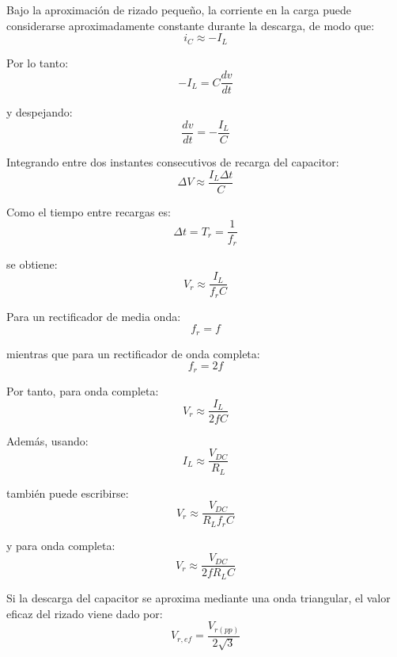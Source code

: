 \documentclass[12pt,a4paper]{article}
\begin{document}
Bajo la aproximación de rizado pequeño, la corriente en la carga puede considerarse aproximadamente constante durante la descarga, de modo que:
\begin{equation}
i_C\approx -I_L
\end{equation}

Por lo tanto:
\begin{equation}
-I_L=C\frac{dv}{dt}
\end{equation}

y despejando:
\begin{equation}
\frac{dv}{dt}=-\frac{I_L}{C}
\end{equation}

Integrando entre dos instantes consecutivos de recarga del capacitor:
\begin{equation}
\Delta V\approx\frac{I_L\Delta t}{C}
\end{equation}

Como el tiempo entre recargas es:
\begin{equation}
\Delta t=T_r=\frac{1}{f_r}
\end{equation}

se obtiene:
\begin{equation}
V_r\approx\frac{I_L}{f_rC}
\end{equation}

Para un rectificador de media onda:
\begin{equation}
f_r=f
\end{equation}

mientras que para un rectificador de onda completa:
\begin{equation}
f_r=2f
\end{equation}

Por tanto, para onda completa:
\begin{equation}
V_r\approx\frac{I_L}{2fC}
\end{equation}

Además, usando:
\begin{equation}
I_L\approx\frac{V_{DC}}{R_L}
\end{equation}

también puede escribirse:
\begin{equation}
V_r\approx\frac{V_{DC}}{R_Lf_rC}
\end{equation}

y para onda completa:
\begin{equation}
V_r\approx\frac{V_{DC}}{2fR_LC}
\end{equation}

Si la descarga del capacitor se aproxima mediante una onda triangular, el valor eficaz del rizado viene dado por:
\begin{equation}
V_{r,ef}=\frac{V_{r(pp)}}{2\sqrt{3}}
\end{equation}
\end{document}
